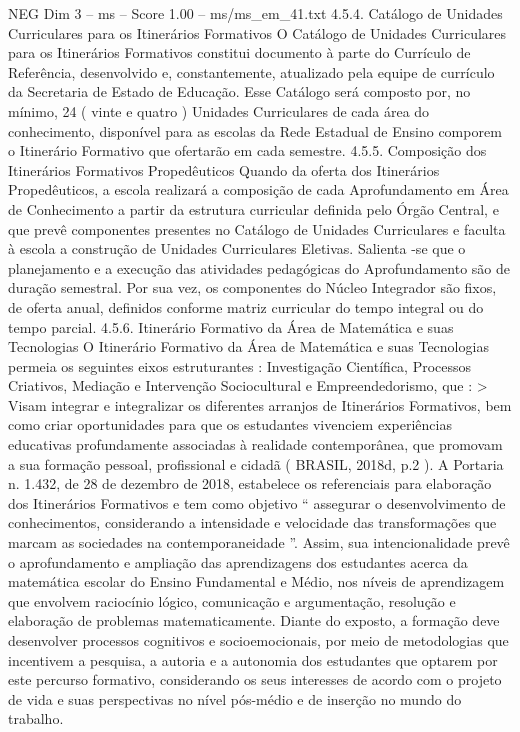 \begin{textsample}{NEG Dim 3 – ms – Score 1.00 – ms/ms\_em\_41.txt}  \label{ex:f3_neg_094}
4.5.4.
Catálogo de Unidades Curriculares para os Itinerários Formativos O Catálogo de Unidades Curriculares para os Itinerários Formativos constitui documento à parte do Currículo de Referência, desenvolvido e, constantemente, atualizado pela equipe de currículo da Secretaria de Estado de Educação.
Esse Catálogo será composto por, no mínimo, 24 ( vinte e quatro ) Unidades Curriculares de cada área do conhecimento, disponível para as escolas da Rede Estadual de Ensino comporem o Itinerário Formativo que ofertarão em cada semestre. 4.5.5.
Composição dos Itinerários Formativos Propedêuticos Quando da oferta dos Itinerários Propedêuticos, a escola realizará a composição de cada Aprofundamento em Área de Conhecimento a partir da estrutura curricular definida pelo Órgão Central, e que prevê componentes presentes no Catálogo de Unidades Curriculares e faculta à escola a construção de Unidades Curriculares Eletivas.
Salienta -se que o planejamento e a execução das atividades pedagógicas do Aprofundamento são de duração semestral.
Por sua vez, os componentes do Núcleo Integrador são fixos, de oferta anual, definidos conforme matriz curricular do tempo integral ou do tempo parcial. 4.5.6.
Itinerário Formativo da Área de Matemática e suas Tecnologias O Itinerário Formativo da Área de Matemática e suas Tecnologias permeia os seguintes eixos estruturantes : Investigação Científica, Processos Criativos, Mediação e Intervenção Sociocultural e Empreendedorismo, que : > Visam integrar e integralizar os diferentes arranjos de Itinerários Formativos, bem como criar oportunidades para que os estudantes vivenciem experiências educativas profundamente associadas à realidade contemporânea, que promovam a sua formação pessoal, profissional e cidadã ( BRASIL, 2018d, p.2 ).
A Portaria n. 1.432, de 28 de dezembro de 2018, estabelece os referenciais para elaboração dos Itinerários Formativos e tem como objetivo “ assegurar o desenvolvimento de conhecimentos, considerando a intensidade e velocidade das transformações que marcam as sociedades na contemporaneidade ”.
Assim, sua intencionalidade prevê o aprofundamento e ampliação das aprendizagens dos estudantes acerca da matemática escolar do Ensino Fundamental e Médio, nos níveis de aprendizagem que envolvem raciocínio lógico, comunicação e argumentação, resolução e elaboração de problemas matematicamente.
Diante do exposto, a formação deve desenvolver processos cognitivos e socioemocionais, por meio de metodologias que incentivem a pesquisa, a autoria e a autonomia dos estudantes que optarem por este percurso formativo, considerando os seus interesses de acordo com o projeto de vida e suas perspectivas no nível pós-médio e de inserção no mundo do trabalho.

\end{textsample}
